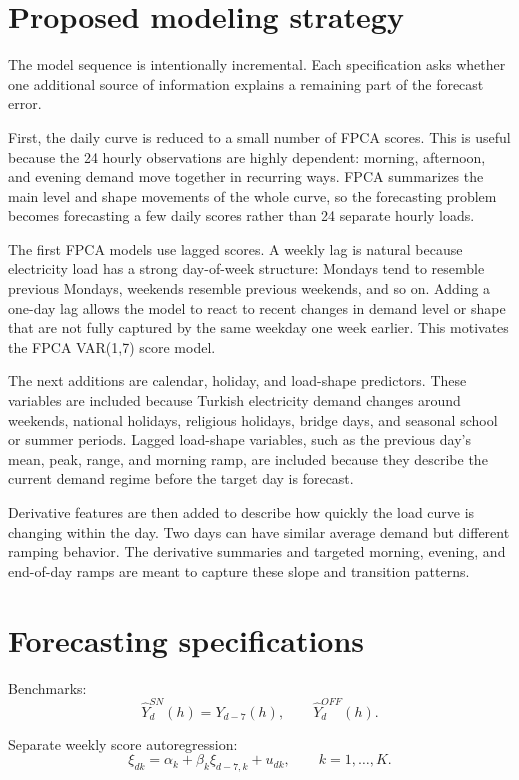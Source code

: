 \documentclass[10pt,a4paper]{article}
\begin{document}
\section*{Proposed modeling strategy}

The model sequence is intentionally incremental. Each specification asks whether one
additional source of information explains a remaining part of the forecast error.

First, the daily curve is reduced to a small number of FPCA scores. This is useful
because the 24 hourly observations are highly dependent: morning, afternoon, and
evening demand move together in recurring ways. FPCA summarizes the main level and
shape movements of the whole curve, so the forecasting problem becomes forecasting a
few daily scores rather than 24 separate hourly loads.

The first FPCA models use lagged scores. A weekly lag is natural because electricity
load has a strong day-of-week structure: Mondays tend to resemble previous Mondays,
weekends resemble previous weekends, and so on. Adding a one-day lag allows the model
to react to recent changes in demand level or shape that are not fully captured by
the same weekday one week earlier. This motivates the FPCA VAR(1,7) score model.

The next additions are calendar, holiday, and load-shape predictors. These variables
are included because Turkish electricity demand changes around weekends, national
holidays, religious holidays, bridge days, and seasonal school or summer
periods. Lagged load-shape variables, such as the previous day's mean, peak, range,
and morning ramp, are included because they describe the current demand regime before
the target day is forecast.

Derivative features are then added to describe how quickly the load curve is changing
within the day. Two days can have similar average demand but different ramping
behavior. The derivative summaries and targeted morning, evening, and end-of-day
ramps are meant to capture these slope and transition patterns.

\section*{Forecasting specifications}

Benchmarks:
\[
\widehat Y_d^{SN}(h)=Y_{d-7}(h),
\qquad
\widehat Y_d^{OFF}(h).
\]

Separate weekly score autoregression:
\[
\xi_{dk}=\alpha_k+\beta_k\xi_{d-7,k}+u_{dk},
\qquad k=1,\ldots,K.
\]
\end{document}
